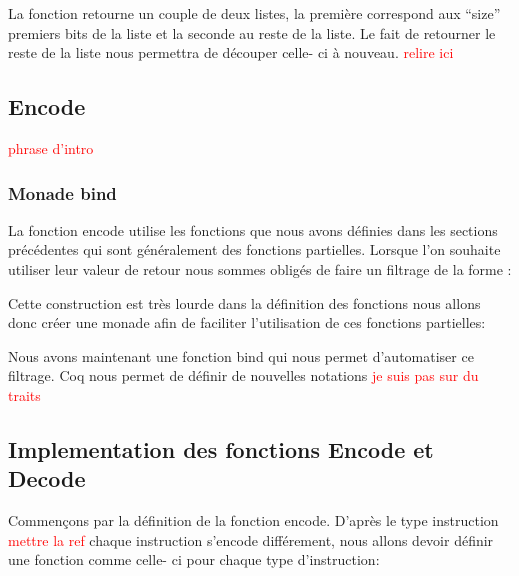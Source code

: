 \documentclass {article}
\newcommand{\codefrom}[3]
           {}
\theoremstyle{definition}
\theoremstyle{remark}
\newcommand{\todo}[1]{\textcolor{red}{#1}}
\begin{document}
\codefrom{src}{encode}{get_first_n_bit}

La fonction retourne un couple de deux listes, la première correspond aux ``size'' premiers
bits de la liste et la seconde au reste  de la liste. Le fait de retourner le reste de la liste
nous permettra de découper celle- ci à nouveau.
\todo{relire ici}




\subsection{Encode}

\todo{phrase d'intro}

\subsubsection{Monade bind}

La fonction encode utilise les fonctions que nous avons définies dans les sections précédentes qui sont généralement
des fonctions partielles. Lorsque l'on souhaite utiliser leur valeur de retour nous sommes obligés de faire un
filtrage de la forme :

\codefrom{rapport}{definitions}{pattern_matching}

Cette construction est très lourde dans la définition des fonctions nous allons donc créer une monade
afin de faciliter l'utilisation de ces fonctions partielles:

\codefrom{src}{encode}{monade}

Nous avons maintenant une fonction bind qui nous permet d'automatiser ce filtrage. Coq nous permet de
définir de nouvelles notations \todo{je suis pas sur du traits}

\codefrom{src}{encode}{notation}






\subsection{Implementation des fonctions Encode et Decode}

Commençons par la définition de la fonction encode. D'après le type instruction \todo{mettre la ref}
chaque instruction s'encode différement, nous allons devoir définir une fonction comme celle- ci
pour chaque type d'instruction:

\codefrom{src}{encode}{encode_t_n}
\end{document}
